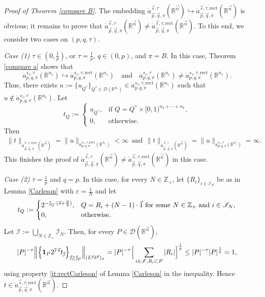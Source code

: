 \documentclass[11pt, reqno]{amsart}
\theoremstyle{definition}
\theoremstyle{remark}
\numberwithin{equation}{section}
\newcommand{\vj}{\vec{\textit{\j}}}
\newcommand{\one}{\mathbf{1}}
\begin{document}
\begin{proof}[Proof of Theorem \ref{compare B}]
The embedding $\dot a^{\vec s,\tau}_{\vec p,\vec q,\pi}(\mathbb R^{\vec n})
\hookrightarrow
\dot a^{\vec s,\tau,\mathrm{rect}}_{\vec p,\vec q,\pi}(\mathbb R^{\vec n})$ is obvious;
it remains to prove that
$\dot a^{\vec s,\tau}_{\vec p,\vec q,\pi}(\mathbb R^{\vec n})
\neq \dot a^{\vec s,\tau,\mathrm{rect}}_{\vec p,\vec q,\pi}(\mathbb R^{\vec n})$.
To this end, we consider two cases on $(p,q,\tau)$.

\emph{Case (1)} $\tau\in(0,\frac 1p)$, or $\tau=\frac 1p$,
$q\in (0,p)$, and $\pi= B$.
In this case, Theorem \ref{compare a} shows that
$$
\dot a^{s_1,\tau}_{p,q,\pi}(\mathbb R^{n_1})
\hookrightarrow \dot a^{s_1,\tau,\mathrm{rect}}_{p,q,\pi}(\mathbb R^{n_1})\quad \text{and} \quad
\dot a^{s_1,\tau}_{p,q,\pi}(\mathbb R^{n_1})
\neq \dot a^{s_1,\tau,\mathrm{rect}}_{p,q,\pi}(\mathbb R^{n_1}).
$$
Thus, there exists $u:=\{u_{Q^*}\}_{Q^*\in\mathscr D(\mathbb R^{n_1})}\in \dot a^{s_1,\tau,\mathrm{rect}}_{p,q,\pi}(\mathbb R^{n_1})$
such that $u\notin \dot a^{s_1,\tau}_{p,q,\pi}(\mathbb R^{n_1})$. Let
$$
t_Q:=\begin{cases}
u_{Q^*},&\text{if } Q=Q^*\times [0,1)^{n_2+\cdots+n_k},\\
0,&\text{otherwise}.
\end{cases}
$$
Then
\begin{align*}
\|t\|_{\dot a^{\vec s,\tau,\mathrm{rect}}_{\vec p,\vec q,\pi}(\mathbb R^{\vec n})}
=\|u\|_{\dot a^{s_1,\tau,\mathrm{rect}}_{p,q,\pi}(\mathbb R^{n_1})}
<\infty
\ \ \text{and} \ \
\|t\|_{\dot a^{\vec s,\tau}_{\vec p,\vec q,\pi}(\mathbb R^{\vec n})}
=\|u\|_{\dot a^{s_1,\tau}_{p,q,\pi}(\mathbb R^{n_1})}
=\infty.
\end{align*}
This finishes the proof of $\dot a^{\vec s,\tau}_{\vec p,\vec q,\pi}(\mathbb R^{\vec n})
\neq \dot a^{\vec s,\tau,\mathrm{rect}}_{\vec p,\vec q,\pi}(\mathbb R^{\vec n})$ in this case.

\emph{Case (2)} $\tau=\frac 1p$ and $q=p$.
In this case, for every $N\in\mathbb Z_+$,
let $\{R_i\}_{i\in \mathscr I_N}$ be as in Lemma \ref{Carleson}
with $\varepsilon=\frac1N$ and let
$$
t_Q:=\begin{cases}
2^{-\vj_Q \cdot (\vec s + \frac{\vec n}2)},
&Q=R_i+ (N-1)\cdot \vec 1
\text{ for some } N\in\mathbb Z_+\text{ and }i\in \mathscr I_N,\\
0,&\text{otherwise}.
\end{cases}
$$
Let $\mathscr I:=\bigcup_{N\in\mathbb Z_+}\mathscr I_N$.
Then, for every $P\in\mathscr D(\mathbb R^{\vec n})$,
\begin{align*}
|P|^{-\tau}
\Big\|\Big\{\one_P 2^{\vj\cdot\vec s}
t_{\vj}\Big\}_{\vj\geq {\vj}_P}\Big\|_{(L^{\vec p}\ell^{\vec p})_\pi}
=|P|^{-\tau} \Big[\sum_{i\in \mathscr I,R_i\subset P}
|R_i|\Big]^{\frac 1p}
\leq |P|^{-\tau} |P|^{\frac 1p}
=1,
\end{align*}
using property \eqref{it:rectCarleson} of Lemma \ref{Carleson} in the inequality.
Hence $t\in \dot a^{\vec s,\tau,\mathrm{rect}}_{\vec p,\vec q,\pi}(\mathbb R^{\vec n})$.


\end{proof}
\end{document}
